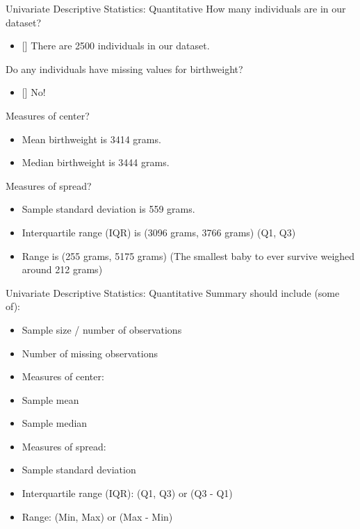 \documentclass[
  ignorenonframetext,
]{beamer}
\providecommand{\tightlist}{%
  \setlength{\itemsep}{0pt}\setlength{\parskip}{0pt}}
\begin{document}
\begin{frame}{Univariate Descriptive Statistics: Quantitative}
\protect\hypertarget{univariate-descriptive-statistics-quantitative}{}
How many individuals are in our dataset?

\begin{itemize}
\tightlist
\item
  {[}{]} {There are 2500 individuals in our dataset.}
\end{itemize}

Do any individuals have missing values for birthweight?

\begin{itemize}
\tightlist
\item
  {[}{]} {No!}
\end{itemize}

Measures of center?

\begin{itemize}
\tightlist
\item
  {Mean birthweight is 3414} grams.
\item
  {Median birthweight is 3444 grams.}
\end{itemize}

Measures of spread?

\begin{itemize}
\tightlist
\item
  {Sample standard deviation is 559 grams.}
\item
  {Interquartile range (IQR) is (3096 grams, 3766 grams) (Q1, Q3) }
\item
  {Range is (255 grams, 5175 grams)} (The smallest baby to ever survive
  weighed around 212 grams)
\end{itemize}
\end{frame}

\begin{frame}{Univariate Descriptive Statistics: Quantitative}
\protect\hypertarget{univariate-descriptive-statistics-quantitative-1}{}
Summary should include (some of):

\begin{itemize}
\item
  Sample size / number of observations
\item
  Number of missing observations
\item
  Measures of center:
\item
  Sample mean
\item
  Sample median
\item
  Measures of spread:
\item
  Sample standard deviation
\item
  Interquartile range (IQR): (Q1, Q3) or (Q3 - Q1)
\item
  Range: (Min, Max) or (Max - Min)
\end{itemize}
\end{frame}
\end{document}
